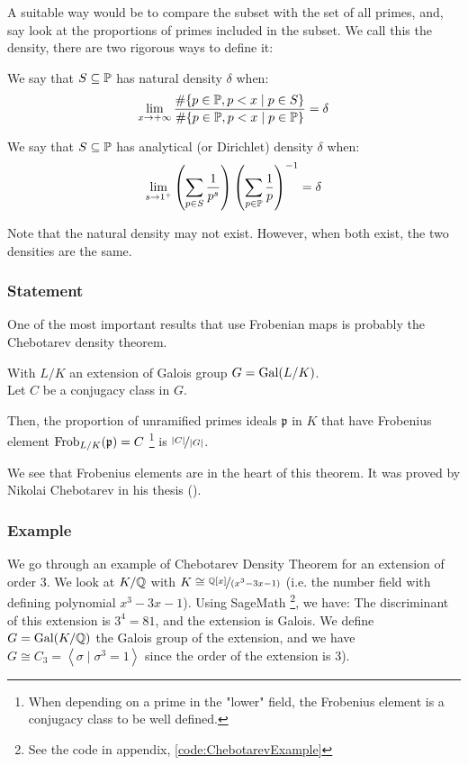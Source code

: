 A suitable way would be to compare the subset with the set of all primes, and, say look at the proportions of primes included in the subset.
We call this the density, there are two rigorous ways to define it:
\begin{definition}
	We say that $S \subseteq \mathbb{P}$ has natural density $\delta$ when:
	$$
	\lim_{x \to +\infty}
	\frac{ \# \{ p \in \mathbb{P}, p < x \mid p \in S \}}
	{ \# \{ p \in \mathbb{P}, p < x \mid p \in \mathbb{P} \}} = \delta
	$$
\end{definition}
\begin{definition}
	We say that $S \subseteq \mathbb{P}$ has analytical (or Dirichlet) density $\delta$ when:
	$$
	\lim_{s \to 1^+}
	\left( \sum_{p \in S} \frac{1}{p^s} \right) 
	\left( \sum_{p \in \mathbb{P}} \frac{1}{p} \right)^{-1} = \delta
	$$
\end{definition}

Note that the natural density may not exist.
However, when both exist, the two densities are the same.



\subsubsection{Statement}
One of the most important results that use Frobenian maps is probably the Chebotarev density theorem.
\begin{theorem}
	With $L/K$ an extension of Galois group $G=\text{Gal}(L/K)$.\\
	Let $C$ be a conjugacy class in $G$.
	
	Then, the proportion of unramified primes ideals $\mathfrak{p}$ in $K$ that have Frobenius element $\text{Frob}_{L/K}(\mathfrak{p})=C$ \footnote{When depending on a prime in the "lower" field, the Frobenius element is a conjugacy class to be well defined.} is $\nicefrac{|C|}{|G|}$.
\end{theorem}
We see that Frobenius elements are in the heart of this theorem.
It was proved by Nikolai Chebotarev in his thesis (\cite{ChebotarevTheorem}).

\subsubsection{Example}
We go through an example of Chebotarev Density Theorem for an extension of order 3.
We look at $K/\mathbb{Q}$ with $K \cong \nicefrac{\mathbb{Q}[x]}{(x^3-3x-1)}$ (i.e. the number field with defining polynomial $x^3 - 3x - 1$).
Using SageMath \footnote{See the code in appendix, \ref{code:ChebotarevExample}}, we have:
The discriminant of this extension is $3^4=81$, and the extension is Galois.
We define $G = \text{Gal}(K/\mathbb{Q})$ the Galois group of the extension, and we have $G \cong C_3 = \left\langle \sigma \mid \sigma^3 = 1 \right\rangle $ since the order of the extension is 3).

